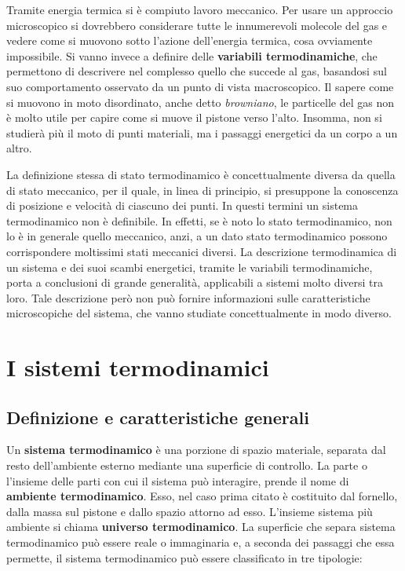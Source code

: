 \FloatBarrier
Tramite energia termica si è compiuto lavoro meccanico. Per usare un approccio microscopico si dovrebbero considerare tutte le innumerevoli molecole del gas e vedere come si muovono sotto l'azione dell'energia termica, cosa ovviamente impossibile. Si vanno invece a definire delle \textbf{variabili termodinamiche}, che permettono di descrivere nel complesso quello che succede al gas, basandosi sul suo comportamento osservato da un punto di vista macroscopico. Il sapere come si muovono in moto disordinato, anche detto \emph{browniano}, le particelle del gas non è molto utile per capire come si muove il pistone verso l'alto. Insomma, non si studierà più il moto di punti materiali, ma i passaggi energetici da un corpo a un altro.

La definizione stessa di stato termodinamico è concettualmente diversa da quella di stato meccanico, per il quale, in linea di principio, si presuppone la conoscenza di posizione e velocità di ciascuno dei punti. In questi termini un sistema termodinamico non è definibile. In effetti, se è noto lo stato termodinamico, non lo è in generale quello meccanico, anzi, a un dato stato termodinamico possono corrispondere moltissimi stati meccanici diversi. La descrizione termodinamica di un sistema e dei suoi scambi energetici, tramite le variabili termodinamiche, porta a conclusioni di grande generalità, applicabili a sistemi molto diversi tra loro. Tale descrizione però non può fornire informazioni sulle caratteristiche microscopiche del sistema, che vanno studiate concettualmente in modo diverso.

\section{I sistemi termodinamici}

\subsection{Definizione e caratteristiche generali}

Un \textbf{sistema termodinamico} è una porzione di spazio materiale, separata dal resto dell'ambiente esterno mediante una superficie di controllo. La parte o l'insieme delle parti con cui il sistema può interagire, prende il nome di \textbf{ambiente termodinamico}. Esso, nel caso prima citato è costituito dal fornello, dalla massa sul pistone e dallo spazio attorno ad esso. L'insieme sistema più ambiente si chiama \textbf{universo termodinamico}. La superficie che separa sistema termodinamico può essere reale o immaginaria e, a seconda dei passaggi che essa permette, il sistema termodinamico può essere classificato in tre tipologie:

